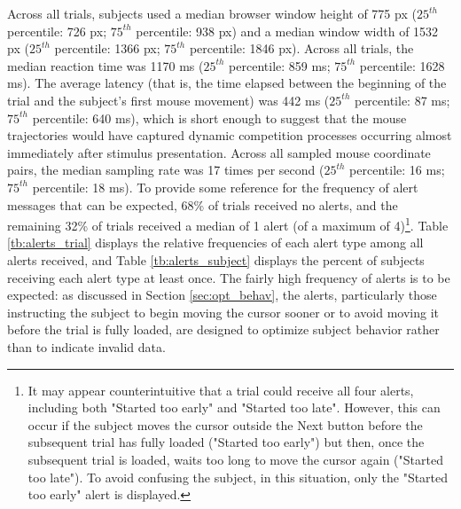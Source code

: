 \documentclass[]{article}
\let\rmarkdownfootnote\footnote%
\def\footnote{\protect\rmarkdownfootnote}
\begin{document}
Across all trials, subjects used a median browser window height of 775
px (\(25^{th}\) percentile: 726 px; \(75^{th}\) percentile: 938 px) and
a median window width of 1532 px (\(25^{th}\) percentile: 1366 px;
\(75^{th}\) percentile: 1846 px). Across all trials, the median reaction
time was 1170 ms (\(25^{th}\) percentile: 859 ms; \(75^{th}\)
percentile: 1628 ms). The average latency (that is, the time elapsed
between the beginning of the trial and the subject's first mouse
movement) was 442 ms (\(25^{th}\) percentile: 87 ms; \(75^{th}\)
percentile: 640 ms), which is short enough to suggest that the mouse
trajectories would have captured dynamic competition processes occurring
almost immediately after stimulus presentation. Across all sampled mouse
coordinate pairs, the median sampling rate was 17 times per second
(\(25^{th}\) percentile: 16 ms; \(75^{th}\) percentile: 18 ms). To
provide some reference for the frequency of alert messages that can be
expected, 68\% of trials received no alerts, and the remaining 32\% of
trials received a median of 1 alert (of a maximum of
4)\footnote{It may appear counterintuitive that a trial could receive all four alerts, including both "Started too early" and "Started too late". However, this can occur if the subject moves the cursor outside the Next button before the subsequent trial has fully loaded ("Started too early") but then, once the subsequent trial is loaded, waits too long to move the cursor again ("Started too late"). To avoid confusing the subject, in this situation, only the "Started too early" alert is displayed.}.
Table \ref{tb:alerts_trial} displays the relative frequencies of each
alert type among all alerts received, and Table \ref{tb:alerts_subject}
displays the percent of subjects receiving each alert type at least
once. The fairly high frequency of alerts is to be expected: as
discussed in Section \ref{sec:opt_behav}, the alerts, particularly those
instructing the subject to begin moving the cursor sooner or to avoid
moving it before the trial is fully loaded, are designed to optimize
subject behavior rather than to indicate invalid data.
\end{document}
